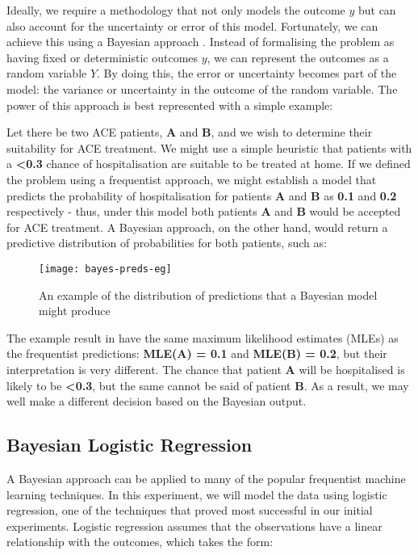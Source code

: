 Ideally, we require a methodology that not only models the outcome $y$ but can also account for the uncertainty or error of this model. Fortunately, we can achieve this using a Bayesian approach \cite{bayesian_da}. Instead of formalising the problem as having fixed or deterministic outcomes $y$, we can represent the outcomes as a random variable $Y$. By doing this, the error or uncertainty becomes part of the model: the variance or uncertainty in the outcome of the random variable. The power of this approach is best represented with a simple example:

Let there be two ACE patients, \textbf{A} and \textbf{B}, and we wish to determine their suitability for ACE treatment. We might use a simple heuristic that patients with a \textbf{\textless 0.3} chance of hospitalisation are suitable to be treated at home. If we defined the problem using a frequentist approach, we might establish a model that predicts the probability of hospitalisation for patients \textbf{A} and \textbf{B} as \textbf{0.1} and \textbf{0.2} respectively - thus, under this model both patients \textbf{A} and \textbf{B} would be accepted for ACE treatment. A Bayesian approach, on the other hand, would return a predictive distribution of probabilities for both patients, such as:

\begin{figure}[H]
    \centering
    \texttt{[image: bayes-preds-eg]}
    \caption[Bayesian prediction examples]{An example of the distribution of predictions that a Bayesian model might produce}
    \label{fig:bayes-preds-eg}
\end{figure}

The example result in  have the same maximum likelihood estimates (MLEs) as the frequentist predictions: \textbf{MLE(A) = 0.1} and \textbf{MLE(B) = 0.2}, but their interpretation is very different. The chance that patient \textbf{A} will be hospitalised is likely to be \textbf{\textless 0.3}, but the same cannot be said of patient \textbf{B}. As a result, we may well make a different decision based on the Bayesian output.

\subsection{Bayesian Logistic Regression}\label{subsec:bayesian-logistic-regression}

A Bayesian approach can be applied to many of the popular frequentist machine learning techniques. In this experiment, we will model the data using logistic regression, one of the techniques that proved most successful in our initial experiments. Logistic regression assumes that the observations have a linear relationship with the outcomes, which takes the form:

